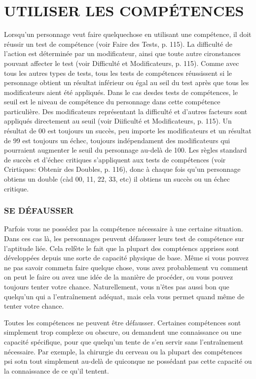 \section{UTILISER LES COMPÉTENCES} Lorsqu'un personnage veut faire quelquechose en utilisant une compétence, il doit réussir un test de compétence (voir Faire des Tests, p. 115). La difficulté de l'action est déterminée par un modificateur, ainsi que toute autre cironstances pouvant affecter le test (voir Difficulté et Modificateurs, p. 115). Comme avec tous les autres types de tests, tous les tests de compétences réussissent si le personnage obtient un résultat inférieur ou égal au seil du test après que tous les modificateurs aient été appliqués. Dans le cas desdes tests de compétences, le seuil est le niveau de compétence du personnage dans cette compétence particulière. Des modificateurs représentant la difficulté et d'autres facteurs sont appliqués directement au seuil (voir Diificulté et Modificateurs, p. 115). Un résultat de 00 est toujours un succès, peu importe les modificateurs et un résultat de 99 est toujours un échec, toujours indépendament des modificateurs qui pourraient augmenter le seuil du personnage au-delà de 100. Les règles standard de succès et d'échec critiques s'appliquent aux tests de compétences (voir Crirtiques: Obtenir des Doubles, p. 116), donc à chaque fois qu'un personnage obtiens un double (càd 00, 11, 22, 33, etc) il obtiens un succès ou un échec critique. 



\subsubsection{SE DÉFAUSSER} Parfois vous ne possédez pas la compétence nécessaire à une certaine situation. Dans ces cas là, les personnages peuvent défausser leurs test de compétence sur l'aptitude liée. Cela relfète le fait que la plupart des comptéencs apprises sont développées depuis une sorte de capacité physique de base. Même si vous pouvez ne pas savoir commetn faire quelque chose, vous avez probablement vu comment on peut le faire ou avez une idée de la manière de procéder, ou vous pouvez toujours tenter votre chance. Naturellement, vous n'êtes pas aussi bon que quelqu'un qui a l'entraînement adéquat, mais cela vous permet quand même de tenter votre chance. 

Toutes les compétences ne peuvent être défausser. Certaines compétences sont simplement trop complexe ou obscure, ou demandent une connaissance ou une capacité spécifique, pour que quelqu'un tente de s'en servir sans l'entraînement nécessaire. Par exemple, la chirurgie du cerveau ou la plupart des compétences psi sotn tout simplement au-delà de quiconque ne possédant pas cette capacité ou la connaissance de ce qu'il tentent. 

